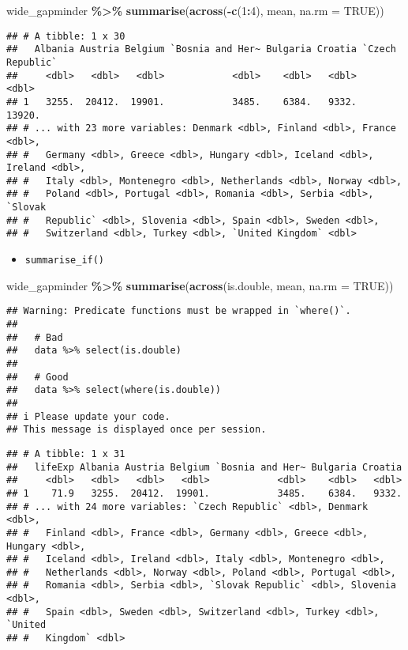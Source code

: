 \documentclass[
]{book}
\newenvironment{Shaded}{\begin{snugshade}}{\end{snugshade}}
\newcommand{\DataTypeTok}[1]{\textcolor[rgb]{0.13,0.29,0.53}{#1}}
\newcommand{\DecValTok}[1]{\textcolor[rgb]{0.00,0.00,0.81}{#1}}
\newcommand{\KeywordTok}[1]{\textcolor[rgb]{0.13,0.29,0.53}{\textbf{#1}}}
\newcommand{\NormalTok}[1]{#1}
\newcommand{\OperatorTok}[1]{\textcolor[rgb]{0.81,0.36,0.00}{\textbf{#1}}}
\newcommand{\OtherTok}[1]{\textcolor[rgb]{0.56,0.35,0.01}{#1}}
\newcommand{\StringTok}[1]{\textcolor[rgb]{0.31,0.60,0.02}{#1}}
\providecommand{\tightlist}{%
  \setlength{\itemsep}{0pt}\setlength{\parskip}{0pt}}
\begin{document}
\begin{Shaded}
\begin{Highlighting}[]
\NormalTok{wide\_gapminder }\OperatorTok{\%\textgreater{}\%}
\StringTok{  }\KeywordTok{summarise}\NormalTok{(}\KeywordTok{across}\NormalTok{(}\OperatorTok{{-}}\KeywordTok{c}\NormalTok{(}\DecValTok{1}\OperatorTok{:}\DecValTok{4}\NormalTok{), mean, }\DataTypeTok{na.rm =} \OtherTok{TRUE}\NormalTok{))}
\end{Highlighting}
\end{Shaded}

\begin{verbatim}
## # A tibble: 1 x 30
##   Albania Austria Belgium `Bosnia and Her~ Bulgaria Croatia `Czech Republic`
##     <dbl>   <dbl>   <dbl>            <dbl>    <dbl>   <dbl>            <dbl>
## 1   3255.  20412.  19901.            3485.    6384.   9332.           13920.
## # ... with 23 more variables: Denmark <dbl>, Finland <dbl>, France <dbl>,
## #   Germany <dbl>, Greece <dbl>, Hungary <dbl>, Iceland <dbl>, Ireland <dbl>,
## #   Italy <dbl>, Montenegro <dbl>, Netherlands <dbl>, Norway <dbl>,
## #   Poland <dbl>, Portugal <dbl>, Romania <dbl>, Serbia <dbl>, `Slovak
## #   Republic` <dbl>, Slovenia <dbl>, Spain <dbl>, Sweden <dbl>,
## #   Switzerland <dbl>, Turkey <dbl>, `United Kingdom` <dbl>
\end{verbatim}

\begin{itemize}
\tightlist
\item
  \texttt{summarise\_if()}
\end{itemize}

\begin{Shaded}
\begin{Highlighting}[]
\NormalTok{wide\_gapminder }\OperatorTok{\%\textgreater{}\%}
\StringTok{  }\KeywordTok{summarise}\NormalTok{(}\KeywordTok{across}\NormalTok{(is.double, mean, }\DataTypeTok{na.rm =} \OtherTok{TRUE}\NormalTok{))}
\end{Highlighting}
\end{Shaded}

\begin{verbatim}
## Warning: Predicate functions must be wrapped in `where()`.
## 
##   # Bad
##   data %>% select(is.double)
## 
##   # Good
##   data %>% select(where(is.double))
## 
## i Please update your code.
## This message is displayed once per session.
\end{verbatim}

\begin{verbatim}
## # A tibble: 1 x 31
##   lifeExp Albania Austria Belgium `Bosnia and Her~ Bulgaria Croatia
##     <dbl>   <dbl>   <dbl>   <dbl>            <dbl>    <dbl>   <dbl>
## 1    71.9   3255.  20412.  19901.            3485.    6384.   9332.
## # ... with 24 more variables: `Czech Republic` <dbl>, Denmark <dbl>,
## #   Finland <dbl>, France <dbl>, Germany <dbl>, Greece <dbl>, Hungary <dbl>,
## #   Iceland <dbl>, Ireland <dbl>, Italy <dbl>, Montenegro <dbl>,
## #   Netherlands <dbl>, Norway <dbl>, Poland <dbl>, Portugal <dbl>,
## #   Romania <dbl>, Serbia <dbl>, `Slovak Republic` <dbl>, Slovenia <dbl>,
## #   Spain <dbl>, Sweden <dbl>, Switzerland <dbl>, Turkey <dbl>, `United
## #   Kingdom` <dbl>
\end{verbatim}
\end{document}
